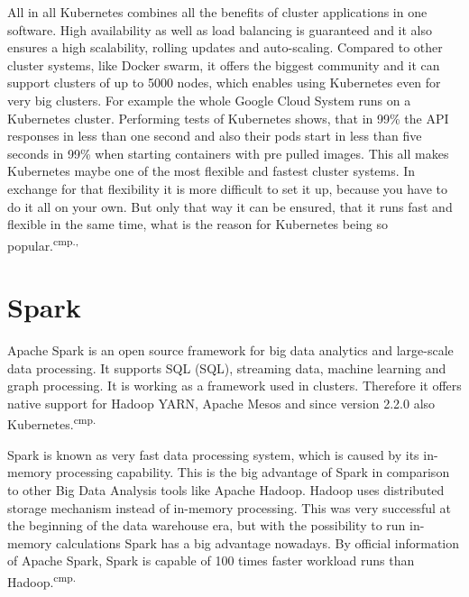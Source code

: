 All in all Kubernetes combines all the benefits of cluster applications in one software. High availability as well as load balancing is guaranteed and it also ensures a high scalability, rolling updates and auto-scaling. Compared to other cluster systems, like Docker swarm, it offers the biggest community and it can support clusters of up to 5000 nodes, which enables using Kubernetes even for very big clusters. For example the whole Google Cloud System runs on a Kubernetes cluster. Performing tests of Kubernetes shows, that in 99\% the API responses in less than one second and also their pods start in less than five seconds in 99\% when starting containers with pre pulled images. This all makes Kubernetes maybe one of the most flexible and fastest cluster systems. In exchange for that flexibility it is more difficult to set it up, because you have to do it all on your own. But only that way it can be ensured, that it runs fast and flexible in the same time, what is the reason for Kubernetes being so popular.\textsuperscript{cmp.\cite{19}, \cite{20}}



\section{Spark}

Apache Spark is an open source framework for big data analytics and large-scale data processing. It supports \acs{SQL} (\acl{SQL}), streaming data, machine learning and graph processing. It is working as a framework used in clusters. Therefore it offers native support for Hadoop YARN, Apache Mesos and since version 2.2.0 also Kubernetes.\textsuperscript{cmp.\cite{21}}


Spark is known as very fast data processing system, which is caused by its in-memory processing capability. This is the big advantage of Spark in comparison to other Big Data Analysis tools like Apache Hadoop. Hadoop uses distributed storage mechanism instead of in-memory processing. This was very successful at the beginning of the data warehouse era, but with the possibility to run in-memory calculations Spark has a big advantage nowadays. By official information of Apache Spark, Spark is capable of 100 times faster workload runs than Hadoop.\textsuperscript{cmp.\cite{22}}

